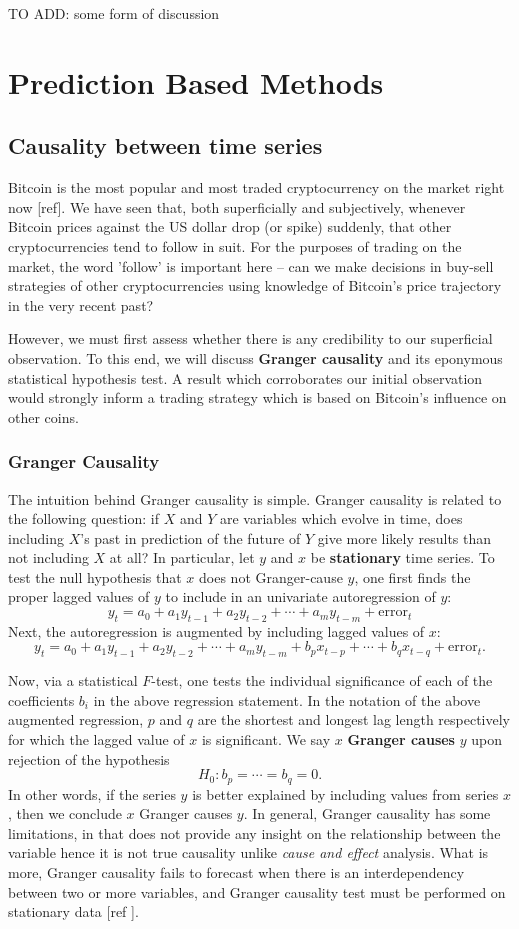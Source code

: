 \documentclass[twoside]{report}
\begin{document}
\begin{spacing}{1}
{\color{red} TO ADD: some form of discussion }


\chapter{Prediction Based Methods}
\section{Causality between time series}
Bitcoin is the most popular and most traded cryptocurrency on the market right now [ref]. We have seen that, both superficially and subjectively, whenever Bitcoin prices against the US dollar drop (or spike) suddenly, that other cryptocurrencies tend to follow in suit. For the purposes of trading on the market, the word 'follow' is important here -- can we make decisions in buy-sell strategies of other cryptocurrencies using knowledge of Bitcoin's price trajectory in the very recent past? 

However, we must first assess whether there is any credibility to our superficial observation. To this end, we will discuss \textbf{Granger causality} and its eponymous statistical hypothesis test. A result which corroborates our initial observation would strongly inform a trading strategy which is based on Bitcoin's influence on other coins. 
\subsection{Granger Causality}
The intuition behind Granger causality is simple. Granger causality is related to the following question: if $X$ and $Y$ are variables which evolve in time, does including $X$'s past in prediction of the future of $Y$ give more likely results than not including $X$ at all? In particular, let $y$ and $x$ be \textbf{stationary} time series. To test the null hypothesis that $x$ does not Granger-cause $y$, one first finds the proper lagged values of $y$ to include in an univariate autoregression of $y$:
\[y_t = a_0 + a_1y_{t-1} + a_2y_{t-2} + \cdots + a_my_{t-m} + \text{error}_t\]
Next, the autoregression is augmented by including lagged values of $x$:
\[y_t = a_0 + a_1y_{t-1} + a_2y_{t-2} + \cdots + a_my_{t-m} + b_px_{t-p} + \cdots + b_qx_{t-q} + \text{error}_t.\]

Now, via a statistical $F$-test, one tests the individual significance of each of the coefficients $b_i$ in the above regression statement. In the notation of the above augmented regression, $p$ and $q$ are the shortest and longest lag length respectively for which the lagged value of $x$ is significant. We say $x$ \textbf{Granger causes} $y$ upon rejection of the hypothesis \[
H_0: b_p = \cdots = b_q = 0. 
\]
In other words, if the series $y$ is better explained by including values from series $x$, then we conclude $x$ Granger causes $y$. 
In general, Granger causality has some limitations, in that does not provide any insight on the relationship between the variable hence it is not true causality unlike \textit{cause and effect} analysis. What is more, Granger causality fails to forecast when there is an interdependency between two or more variables, and Granger causality test must be performed on stationary data [ref ].


\end{spacing}
\end{document}
